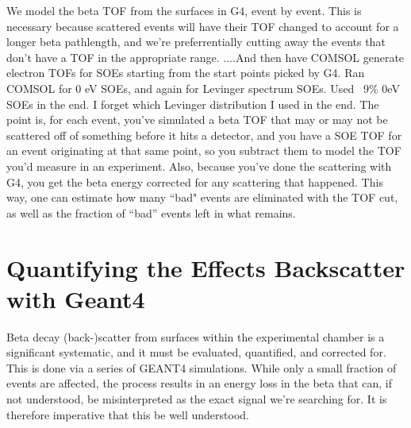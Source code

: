 	We model the beta TOF from the surfaces in G4, event by event.  This is necessary because scattered  events will have their TOF changed to account for a longer beta pathlength, and we're preferrentially cutting away the events that don't have a TOF in the appropriate range.  ....And then have COMSOL generate electron TOFs for SOEs starting from the start points picked by G4.  Ran COMSOL for 0 eV SOEs, and again for Levinger spectrum SOEs.  Used ~9\% 0eV SOEs in the end.  I forget which Levinger distribution I used in the end.    The point is, for each event, you've simulated a beta TOF that may or may not be scattered off of something before it hits a detector, and you have a SOE TOF for an event originating at that same point, so you subtract them to model the TOF you'd measure in an experiment.  Also, because you've done the scattering with G4, you get the beta energy corrected for any scattering that happened.  This way, one can estimate %
how many ``bad" events are eliminated with the TOF cut, as well as the fraction of ``bad'' events left in what remains.
	

\section{Quantifying the Effects Backscatter with Geant4}
	Beta decay (back-)scatter from surfaces within the experimental chamber is a significant systematic, and it must be evaluated, quantified, and corrected for.  This is done via a series of GEANT4 simulations.  While only a small fraction of events are affected, the process results in an energy loss in the beta that can, if not understood, be misinterpreted as the exact signal we're searching for.  It is therefore imperative that this be well understood. 
	
